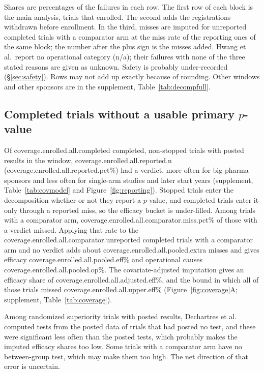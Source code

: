 \documentclass[preprint,11pt]{elsarticle}
\begin{document}
\begin{table}[htb]
\smallskip
\begin{minipage}{\linewidth}\footnotesize
Shares are percentages of the failures in each row. The first row of each block is the main analysis, trials that enrolled. The second adds the registrations withdrawn before enrollment. In the third, misses are imputed for unreported completed trials with a comparator arm at the miss rate of the reporting ones of the same block; the number after the plus sign is the misses added. Hwang et al.\ report no operational category (n/a); their failures with none of the three stated reasons are given as unknown. Safety is probably under-recorded (\S\ref{sec:safety}). Rows may not add up exactly because of rounding. Other windows and other sponsors are in the supplement, Table~\ref{tab:decompfull}.
\end{minipage}
\end{table}

\subsection{Completed trials without a usable primary \texorpdfstring{$p$}{p}-value}\label{sec:coverage}
Of \num{coverage.enrolled.all.completed} completed, non-stopped trials with posted results in the window, \num{coverage.enrolled.all.reported.n} (\num{coverage.enrolled.all.reported.pct}\%) had a verdict, more often for big-pharma sponsors and less often for single-arm studies and later start years (supplement, Table~\ref{tab:covmodel} and Figure~\ref{fig:reporting}). Stopped trials enter the decomposition whether or not they report a $p$-value, and completed trials enter it only through a reported miss, so the efficacy bucket is under-filled. Among trials with a comparator arm, \num{coverage.enrolled.all.comparator.miss.pct}\% of those with a verdict missed. Applying that rate to the \num{coverage.enrolled.all.comparator.unreported} completed trials with a comparator arm and no verdict adds about \num{coverage.enrolled.all.pooled.extra} misses and gives efficacy \num{coverage.enrolled.all.pooled.eff}\% and operational causes \num{coverage.enrolled.all.pooled.op}\%. The covariate-adjusted imputation gives an efficacy share of \num{coverage.enrolled.all.adjusted.eff}\%, and the bound in which all of those trials missed \num{coverage.enrolled.all.upper.eff}\% (Figure~\ref{fig:coverage}A; supplement, Table~\ref{tab:coverage}).

Among randomized superiority trials with posted results, Dechartres et al.~\cite{dechartres2016} computed tests from the posted data of trials that had posted no test, and these were significant less often than the posted tests, which probably makes the imputed efficacy shares too low. Some trials with a comparator arm have no between-group test, which may make them too high. The net direction of that error is uncertain.
\end{document}
